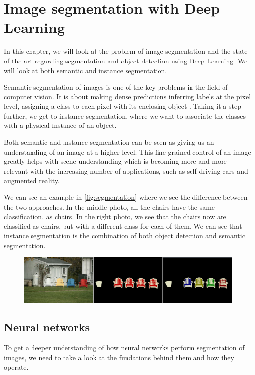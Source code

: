 \chapter{Image segmentation with Deep Learning}
In this chapter, we will look at the problem of image segmentation and the state of the art regarding segmentation and object detection using Deep Learning. We will look at both semantic and instance segmentation.

Semantic segmentation of images is one of the key problems in the field of computer vision. It is about making dense predictions inferring labels at the pixel level, assigning a class to each pixel with its enclosing object \cite{Garcia-Garcia2017}. Taking it a step further, we get to instance segmentation, where we want to associate the classes with a physical instance of an object. 

Both semantic and instance segmentation can be seen as giving us an understanding of an image at a higher level. This fine-grained control of an image greatly helps with scene understanding which is becoming more and more relevant with the increasing number of applications, such as self-driving cars and augmented reality. 

We can see an example in \autoref{fig:segmentation} where we see the difference between the two approaches. In the middle photo, all the chairs have the same classification, as chairs. In the right photo, we see that the chairs now are classified as chairs, but with a different class for each of them. We can see that instance segmentation is the combination of both object detection and semantic segmentation.

\begin{figure}[H]
	\centering
	\includegraphics[width=\linewidth]{fig/se.png}
	\label{fig:segmentation}
\end{figure}


\section{Neural networks}
To get a deeper understanding of how neural networks perform segmentation of images, we need to take a look at the fundations behind them and how they operate.

